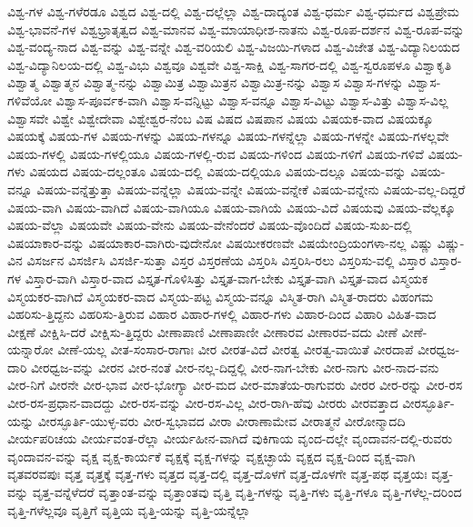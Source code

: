 {ವಿಶ್ವ-ಗಳ
ವಿಶ್ವ-ಗಳೆರಡೂ
ವಿಶ್ವದ
ವಿಶ್ವ-ದಲ್ಲಿ
ವಿಶ್ವ-ದಲ್ಲೆಲ್ಲಾ
ವಿಶ್ವ-ದಾದ್ಯಂತ
ವಿಶ್ವ-ಧರ್ಮ
ವಿಶ್ವ-ಧರ್ಮದ
ವಿಶ್ವಪ್ರೇಮ
ವಿಶ್ವ-ಭಾವನೆ-ಗಳ
ವಿಶ್ವಭ್ರಾತೃತ್ವದ
ವಿಶ್ವ-ಮಾನವ
ವಿಶ್ವ-ಮಾಯಾಧೀಶ-ನಾತನು
ವಿಶ್ವ-ರೂಪ-ದರ್ಶನ
ವಿಶ್ವ-ರೂಪ-ವನ್ನು
ವಿಶ್ವ-ವಂದ್ಯ-ನಾದ
ವಿಶ್ವ-ವನ್ನು
ವಿಶ್ವ-ವನ್ನೇ
ವಿಶ್ವ-ವರಿಯಲಿ
ವಿಶ್ವ-ವಿಜಯಿ-ಗಳಾದ
ವಿಶ್ವ-ವಿಜೇತ
ವಿಶ್ವ-ವಿದ್ಯಾನಿಲಯದ
ವಿಶ್ವ-ವಿದ್ಯಾನಿಲಯ-ದಲ್ಲಿ
ವಿಶ್ವ-ವಿಭು
ವಿಶ್ವವೂ
ವಿಶ್ವವೇ
ವಿಶ್ವ-ಸಾಕ್ಷಿ
ವಿಶ್ವ-ಸಾಗರ-ದಲ್ಲಿ
ವಿಶ್ವ-ಸ್ವರೂಪಳೂ
ವಿಶ್ವಾಕೃತಿ
ವಿಶ್ವಾತ್ಮ
ವಿಶ್ವಾತ್ಮನ
ವಿಶ್ವಾತ್ಮ-ನನ್ನು
ವಿಶ್ವಾಮಿತ್ರ
ವಿಶ್ವಾಮಿತ್ರನ
ವಿಶ್ವಾಮಿತ್ರ-ನನ್ನು
ವಿಶ್ವಾಸ
ವಿಶ್ವಾಸ-ಗಳನ್ನು
ವಿಶ್ವಾಸ-ಗಳಿವೆಯೋ
ವಿಶ್ವಾಸ-ಪೂರ್ವಕ-ವಾಗಿ
ವಿಶ್ವಾಸ-ವನ್ನಿಟ್ಟು
ವಿಶ್ವಾಸ-ವನ್ನೂ
ವಿಶ್ವಾಸ-ವಿಟ್ಟು
ವಿಶ್ವಾಸ-ವಿತ್ತು
ವಿಶ್ವಾಸ-ವಿಲ್ಲ
ವಿಶ್ವಾಸವೇ
ವಿಶ್ವೇ
ವಿಶ್ವೇದೇವಾ
ವಿಶ್ವೇಶ್ವರ-ನೆಂಬ
ವಿಷ
ವಿಷದ
ವಿಷಪಾನ
ವಿಷಯ
ವಿಷಯಕ-ವಾದ
ವಿಷಯಕ್ಕೂ
ವಿಷಯಕ್ಕೆ
ವಿಷಯ-ಗಳ
ವಿಷಯ-ಗಳನ್ನು
ವಿಷಯ-ಗಳನ್ನೂ
ವಿಷಯ-ಗಳನ್ನೆಲ್ಲಾ
ವಿಷಯ-ಗಳನ್ನೇ
ವಿಷಯ-ಗಳಲ್ಲವೇ
ವಿಷಯ-ಗಳಲ್ಲಿ
ವಿಷಯ-ಗಳಲ್ಲಿಯೂ
ವಿಷಯ-ಗಳಲ್ಲಿ-ರುವ
ವಿಷಯ-ಗಳಿಂದ
ವಿಷಯ-ಗಳಿಗೆ
ವಿಷಯ-ಗಳಿವೆ
ವಿಷಯ-ಗಳು
ವಿಷಯದ
ವಿಷಯ-ದಲ್ಲಂತೂ
ವಿಷಯ-ದಲ್ಲಿ
ವಿಷಯ-ದಲ್ಲಿಯೂ
ವಿಷಯ-ದಲ್ಲೂ
ವಿಷಯ-ವನ್ನು
ವಿಷಯ-ವನ್ನೂ
ವಿಷಯ-ವನ್ನೆತ್ತುತ್ತಾ
ವಿಷಯ-ವನ್ನೆಲ್ಲಾ
ವಿಷಯ-ವನ್ನೇ
ವಿಷಯ-ವನ್ನೇಕೆ
ವಿಷಯ-ವನ್ನೇನು
ವಿಷಯ-ವಲ್ಲ-ದಿದ್ದರೆ
ವಿಷಯ-ವಾಗಿ
ವಿಷಯ-ವಾಗಿದೆ
ವಿಷಯ-ವಾಗಿಯೂ
ವಿಷಯ-ವಾಗಿಯೆ
ವಿಷಯ-ವಿದೆ
ವಿಷಯವು
ವಿಷಯ-ವೆಲ್ಲಕ್ಕೂ
ವಿಷಯ-ವೆಲ್ಲಾ
ವಿಷಯವೇ
ವಿಷಯ-ವೇನು
ವಿಷಯ-ವೇನೆಂದರೆ
ವಿಷಯ-ವೊಂದಿದೆ
ವಿಷಯ-ಸುಖ-ದಲ್ಲಿ
ವಿಷಯಾಕಾರ-ವನ್ನು
ವಿಷಯಾಕಾರ-ವಾಗಿರು-ವುದೇನೋ
ವಿಷಯೀಕರಣವೇ
ವಿಷಯೇಂದ್ರಿಯಂಗಳಾ-ನಲ್ಲ
ವಿಷ್ಣು
ವಿಷ್ಣು-ವಿನ
ವಿಸರ್ಜನ
ವಿಸರ್ಜಿಸಿ
ವಿಸರ್ಜಿ-ಸುತ್ತಾ
ವಿಸ್ತರ
ವಿಸ್ತರಣೆಯ
ವಿಸ್ತರಿಸಿ
ವಿಸ್ತರಿಸಿ-ರಲು
ವಿಸ್ತರಿಸು-ವಲ್ಲಿ
ವಿಸ್ತಾರ
ವಿಸ್ತಾರ-ಗಳ
ವಿಸ್ತಾರ-ವಾಗಿ
ವಿಸ್ತಾರ-ವಾದ
ವಿಸ್ತೃತ-ಗೊಳಿಸಿತ್ತು
ವಿಸ್ತೃತ-ವಾಗ-ಬೇಕು
ವಿಸ್ತೃತ-ವಾಗಿ
ವಿಸ್ತೃತ-ವಾದ
ವಿಸ್ಮಯಕ
ವಿಸ್ಮಯಕರ-ವಾಗಿದೆ
ವಿಸ್ಮಯಕರ-ವಾದ
ವಿಸ್ಮಯ-ಪಟ್ಟ
ವಿಸ್ಮಯ-ವನ್ನೂ
ವಿಸ್ಮಿತ-ರಾಗಿ
ವಿಸ್ಮಿತ-ರಾದರು
ವಿಹಂಗಮ
ವಿಹರಿಸು-ತ್ತಿದ್ದನು
ವಿಹರಿಸು-ತ್ತಿರುವ
ವಿಹಾರ
ವಿಹಾರ-ಗಳಲ್ಲಿ
ವಿಹಾರ-ಗಳು
ವಿಹಾರ-ದಿಂದ
ವಿಹಾರಿ
ವಿಹಿತ-ವಾದ
ವೀಕ್ಷಣೆ
ವೀಕ್ಷಿಸಿ-ದರೆ
ವೀಕ್ಷಿಸು-ತ್ತಿದ್ದರು
ವೀಣಾಪಾಣಿ
ವೀಣಾಪಾಣೀ
ವೀಣಾರವ
ವೀಣಾರವ-ವದು
ವೀಣೆ
ವೀಣೆ-ಯನ್ನಾರೋ
ವೀಣೆ-ಯಲ್ಲ
ವೀತ-ಸಂಸಾರ-ರಾಗಾಃ
ವೀರ
ವೀರತ-ವಿದೆ
ವೀರತ್ವ
ವೀರತ್ವ-ವಾಯಿತೆ
ವೀರದಾಪೆ
ವೀರಧ್ವಜ-ದಾರಿ
ವೀರಧ್ವಜ-ವನ್ನು
ವೀರನ
ವೀರ-ನಂತೆ
ವೀರ-ನಲ್ಲ-ದಿದ್ದಲ್ಲಿ
ವೀರ-ನಾಗ-ಬೇಕು
ವೀರ-ನಾಗು
ವೀರ-ನಾದ-ವನು
ವೀರ-ನಿಗೆ
ವೀರನೇ
ವೀರ-ಭಾವ
ವೀರ-ಭೋಗ್ಯಾ
ವೀರ-ಮದ
ವೀರ-ಮಾತೆಯ-ರಾಗುವರು
ವೀರರ
ವೀರ-ರನ್ನು
ವೀರ-ರಸ
ವೀರ-ರಸ-ಪ್ರಧಾನ-ವಾದದ್ದು
ವೀರ-ರಸ-ವನ್ನು
ವೀರ-ರಸ-ವಿಲ್ಲ
ವೀರ-ರಾಗಿ-ಹೆವು
ವೀರರು
ವೀರವತ್ತಾದ
ವೀರಸ್ಫೂರ್ತಿ-ಯನ್ನು
ವೀರಸ್ಫೂರ್ತಿ-ಯುಳ್ಳ-ವರು
ವೀರ-ಸ್ವಭಾವದ
ವೀರಾ
ವೀರಾಣಾಮೇವ
ವೀರಾತ್ಮನೆ
ವೀರೋನ್ಮಾದದಿ
ವೀರ್ಯಪರಿಚಯ
ವೀರ್ಯವಂತ-ರೆಲ್ಲಾ
ವೀರ್ಯಹೀನ-ವಾಗಿದೆ
ವುಕಿಗಾಯ
ವೃಂದ-ದಲ್ಲೇ
ವೃಂದಾವನ-ದಲ್ಲಿ-ರುವರು
ವೃಂದಾವನ-ವನ್ನು
ವೃಕ್ಷ
ವೃಕ್ಷ-ಕಾರ್ಯಕೆ
ವೃಕ್ಷಕ್ಕೆ
ವೃಕ್ಷ-ಗಳನ್ನು
ವೃಕ್ಷಚ್ಛಾಯೆ
ವೃಕ್ಷದ
ವೃಕ್ಷ-ದಿಂದ
ವೃಕ್ಷ-ವಾಗಿ
ವೃತವರವಪುಃ
ವೃತ್ತ
ವೃತ್ತಕ್ಕೆ
ವೃತ್ತ-ಗಳು
ವೃತ್ತದ
ವೃತ್ತ-ದಲ್ಲಿ
ವೃತ್ತ-ದೊಳಗೆ
ವೃತ್ತ-ದೊಳಗೇ
ವೃತ್ತ-ಪಥ
ವೃತ್ತಯಃ
ವೃತ್ತ-ವನ್ನು
ವೃತ್ತ-ವನ್ನೆಳೆದರೆ
ವೃತ್ತಾಂತ-ವನ್ನು
ವೃತ್ತಾಂತವು
ವೃತ್ತಿ
ವೃತ್ತಿ-ಗಳನ್ನು
ವೃತ್ತಿ-ಗಳು
ವೃತ್ತಿ-ಗಳೂ
ವೃತ್ತಿ-ಗಳೆಲ್ಲ-ದರಿಂದ
ವೃತ್ತಿ-ಗಳೆಲ್ಲವೂ
ವೃತ್ತಿಗೆ
ವೃತ್ತಿಯ
ವೃತ್ತಿ-ಯನ್ನು
ವೃತ್ತಿ-ಯನ್ನೆಲ್ಲಾ
}
